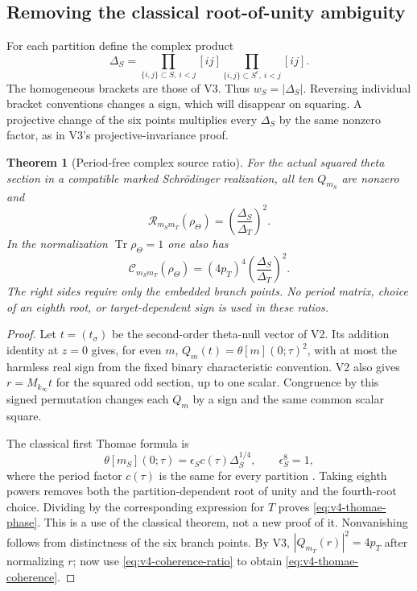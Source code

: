 \documentclass[11pt]{article}
\newtheorem{theorem}{Theorem}[section]
\theoremstyle{definition}
\theoremstyle{remark}
\newcommand{\Tr}{\operatorname{Tr}}
\begin{document}
\subsection{Removing the classical root-of-unity ambiguity}
For each partition define the complex product
\begin{equation}
 \Delta_S=\prod_{\{i,j\}\subset S,\ i<j}[ij]
           \prod_{\{i,j\}\subset S^c,\ i<j}[ij].
 \label{eq:v4-complex-delta}
\end{equation}
The homogeneous brackets are those of V3. Thus $w_S=|\Delta_S|$. Reversing
individual bracket conventions changes a sign, which will disappear on
squaring. A projective change of the six points multiplies every
$\Delta_S$ by the same nonzero factor, as in V3's projective-invariance
proof.

\begin{theorem}[Period-free complex source ratio]
\label{thm:v4-complex-thomae}
For the actual squared theta section in a compatible marked Schr\"odinger
realization, all ten $Q_{m_S}$ are nonzero and
\begin{equation}
 \boxed{\mathcal R_{m_Sm_T}(\rho_\Theta)
       =\left(\frac{\Delta_S}{\Delta_T}\right)^2.}
 \label{eq:v4-thomae-phase}
\end{equation}
In the normalization $\Tr\rho_\Theta=1$ one also has
\begin{equation}
 \boxed{\mathcal C_{m_Sm_T}(\rho_\Theta)
       =(4p_T)^4\left(\frac{\Delta_S}{\Delta_T}\right)^2.}
 \label{eq:v4-thomae-coherence}
\end{equation}
The right sides require only the embedded branch points. No period matrix,
choice of an eighth root, or target-dependent sign is used in these ratios.
\end{theorem}
\begin{proof}
Let $t=(t_\sigma)$ be the second-order theta-null vector of V2. Its addition
identity at $z=0$ gives, for even $m$, $Q_m(t)=\theta[m](0;\tau)^2$, with
at most the harmless real sign from the fixed binary characteristic
convention. V2 also gives $r=M_{k_\infty}t$ for the squared odd section,
up to one scalar. Congruence by this signed permutation changes each
$Q_m$ by a sign and the same common scalar square.

The classical first Thomae formula is
\[
 \theta[m_S](0;\tau)
 =\epsilon_S c(\tau)\Delta_S^{1/4},\qquad \epsilon_S^8=1,
\]
where the period factor $c(\tau)$ is the same for every partition
\cite[Section 2.6]{BernatskaThomae}. Taking eighth powers removes both the
partition-dependent root of unity and the fourth-root choice. Dividing
by the corresponding expression for $T$ proves
\eqref{eq:v4-thomae-phase}. This is a use of the classical theorem, not a
new proof of it. Nonvanishing follows from distinctness of the six branch
points. By V3, $|Q_{m_T}(r)|^2=4p_T$ after normalizing $r$; now use
\eqref{eq:v4-coherence-ratio} to obtain
\eqref{eq:v4-thomae-coherence}.
\end{proof}
\end{document}
